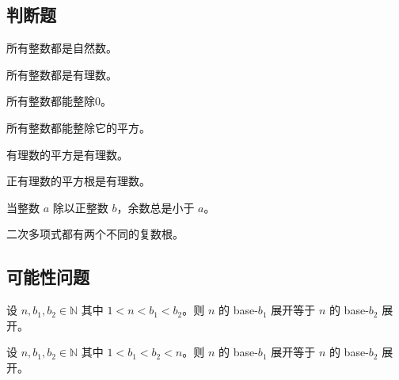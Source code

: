 \subsection*{判断题}


\begin{chapex} %
\label{cqGettingStartedTFBegin}
所有整数都是自然数。
\end{chapex}

\begin{chapex} %
所有整数都是有理数。
\end{chapex}

\begin{chapex} %
所有整数都能整除0。
\end{chapex}

\begin{chapex} %
所有整数都能整除它的平方。
\end{chapex}

\begin{chapex} %
有理数的平方是有理数。
\end{chapex}

\begin{chapex} %
正有理数的平方根是有理数。
\end{chapex}

\begin{chapex} %
当整数 $a$ 除以正整数 $b$，余数总是小于 $a$。
\end{chapex}

\begin{chapex} %
\label{cqGettingStartedTFEnd}
二次多项式都有两个不同的复数根。
\end{chapex}

\subsection*{可能性问题}


\begin{chapex} %
\label{cqGettingStartedASNBegin}
设 $n,b_1,b_2 \in \mathbb{N}$ 其中 $1 < n < b_1 < b_2$。则 $n$ 的 base-$b_1$ 展开等于 $n$ 的 base-$b_2$ 展开。
\end{chapex}

\begin{chapex} %
设 $n,b_1,b_2 \in \mathbb{N}$ 其中 $1 < b_1 < b_2 < n$。则 $n$ 的 base-$b_1$ 展开等于 $n$ 的 base-$b_2$ 展开。
\end{chapex}

